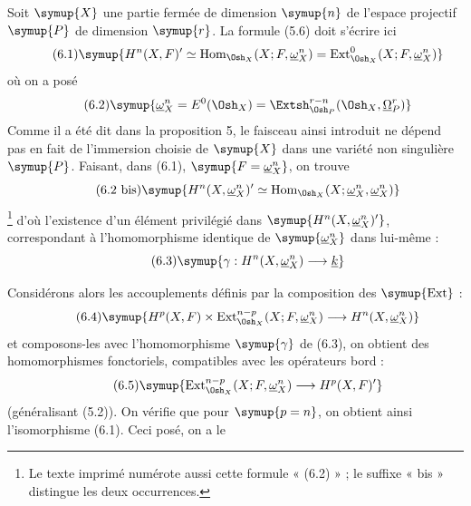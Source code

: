 Soit $\symup{X}$ une partie fermée de dimension $\symup{n}$ de l'espace projectif $\symup{P}$ de
dimension $\symup{r}$. La formule (5.6) doit s'écrire ici
\begin{equation}\tag{6.1}
  \symup{H^{n}(X,F)'
  \simeq\operatorname{Hom}_{\Osh_X}(X;F,\underline{\omega}_X^{n})
  =\operatorname{Ext}_{\Osh_X}^{0}(X;F,\underline{\omega}_X^{n})}
\end{equation}
où on a posé
\begin{equation}\tag{6.2}
  \symup{\underline{\omega}_X^{n}=E^{0}(\Osh_X)
  =\Extsh_{\Osh_P}^{r-n}(\Osh_X,\underline{\Omega}_P^{r})}
\end{equation}
Comme il a été dit dans la proposition 5, le faisceau ainsi introduit ne dépend
pas en fait de l'immersion choisie de $\symup{X}$ dans une variété non singulière $\symup{P}$.
Faisant, dans (6.1), $\symup{F=\underline{\omega}_X^{n}}$, on trouve
\begin{equation}\tag{6.2 bis}
  \symup{H^{n}(X,\underline{\omega}_X^{n})'
  \simeq\operatorname{Hom}_{\Osh_X}(X;\underline{\omega}_X^{n},\underline{\omega}_X^{n})}
\end{equation}
\footnote{Le texte imprimé numérote aussi cette formule « (6.2) » ; le suffixe
« bis » distingue les deux occurrences.} d'où l'existence d'un élément
privilégié dans $\symup{H^{n}(X,\underline{\omega}_X^{n})'}$, correspondant à l'homomorphisme
identique de $\symup{\underline{\omega}_X^{n}}$ dans lui-même :
\begin{equation}\tag{6.3}
  \symup{\gamma:H^{n}(X,\underline{\omega}_X^{n})\longrightarrow\underline{k}}
\end{equation}

Considérons alors les accouplements définis par la composition des $\symup{\operatorname{Ext}}$ :
\begin{equation}\tag{6.4}
  \symup{H^{p}(X,F)\times
  \operatorname{Ext}_{\Osh_X}^{n-p}(X;F,\underline{\omega}_X^{n})
  \longrightarrow H^{n}(X,\underline{\omega}_X^{n})}
\end{equation}
et composons-les avec l'homomorphisme $\symup{\gamma}$ de (6.3), on obtient des
homomorphismes fonctoriels, compatibles avec les opérateurs bord :
\begin{equation}\tag{6.5}
  \symup{\operatorname{Ext}_{\Osh_X}^{n-p}(X;F,\underline{\omega}_X^{n})
  \longrightarrow H^{p}(X,F)'}
\end{equation}
(généralisant (5.2)). On vérifie que pour $\symup{p=n}$, on obtient ainsi
l'isomorphisme (6.1). Ceci posé, on a le

